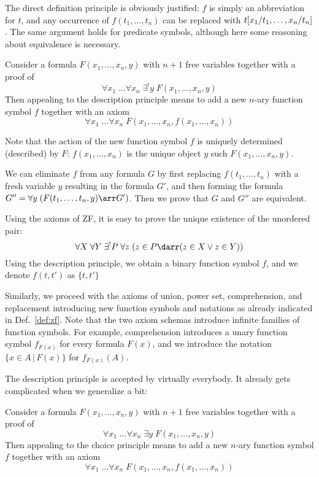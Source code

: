The direct definition principle is obviously justified: $f$ is simply an abbreviation for $t$, and any occurrence of $f(t_1,\ldots,t_n)$ can be replaced with $t[x_1/t_1,\ldots,x_n/t_n]$. The same argument holds for predicate symbols, although here some reasoning about equivalence is necessary.

\begin{definition}
Consider a formula $F(x_1,\ldots,x_n,y)$ with $n+1$ free variables together with a proof of
\[\forall x_1\;\ldots\forall x_n\;\exists^! y\;F(x_1,\ldots,x_n,y)\]
Then appealing to the description principle means to add a new $n$-ary function symbol $f$ together with an axiom
\[\forall x_1\;\ldots\forall x_n\;F(x_1,\ldots,x_n,f(x_1,\ldots,x_n))\]
\end{definition}

Note that the action of the new function symbol $f$ is uniquely determined (described) by $F$: $f(x_1,\ldots,x_n)$ is the unique object $y$ such $F(x_1,\ldots,x_n,y)$.

We can eliminate $f$ from any formula $G$ by first replacing $f(t_1,\ldots,t_n)$ with a fresh variable $y$ resulting in the formula $G'$, and then forming the formula $G''=\forall y\;(F(t_1,\ldots,t_n,y)\arr G')$. Then we prove that $G$ and $G''$ are equivalent.

\begin{example}
Using the axioms of ZF, it is easy to prove the unique existence of the unordered pair:
\[\forall X\;\forall Y\;\exists^! P\; \forall z\;(z\in P \darr (z\in X \vee z \in Y))\]
Using the description principle, we obtain a binary function symbol $f$, and we denote $f(t,t')$ as $\{t,t'\}$

Similarly, we proceed with the axioms of union, power set, comprehension, and replacement introducing new function symbols and notations as already indicated in Def.~\ref{def:zf}. Note that the two axiom schemas introduce infinite families of function symbols. For example, comprehension introduces a unary function symbol $f_{F(x)}$ for every formula $F(x)$, and we introduce the notation $\{x\in A \,|\, F(x)\}$ for $f_{F(x)}(A)$.
\end{example}

The description principle is accepted by virtually everybody. It already gets complicated when we generalize a bit:

\begin{definition}
Consider a formula $F(x_1,\ldots,x_n,y)$ with $n+1$ free variables together with a proof of
\[\forall x_1\;\ldots\forall x_n\;\exists y\;F(x_1,\ldots,x_n,y)\]
Then appealing to the choice principle means to add a new $n$-ary function symbol $f$ together with an axiom
\[\forall x_1\;\ldots\forall x_n\;F(x_1,\ldots,x_n,f(x_1,\ldots,x_n))\]
\end{definition}

